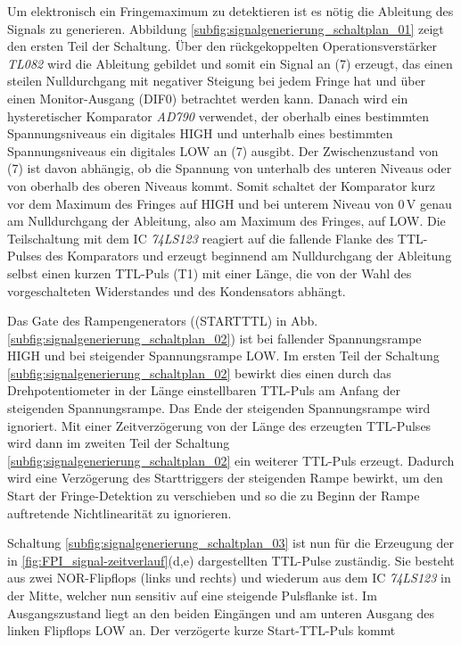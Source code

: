 Um elektronisch ein Fringemaximum zu detektieren ist es nötig die Ableitung
des Signals zu generieren. Abbildung
\ref{subfig:signalgenerierung_schaltplan_01} zeigt den ersten Teil der Schaltung. Über den rückgekoppelten Operationsverstärker
\textit{TL082} wird die Ableitung gebildet und somit ein Signal an (7)
erzeugt, das einen steilen Nulldurchgang mit negativer Steigung bei jedem Fringe hat und über einen
Monitor-Ausgang (DIF0) betrachtet werden kann. Danach wird ein
hysteretischer Komparator \textit{AD790} verwendet, der oberhalb eines
bestimmten Spannungsniveaus ein digitales HIGH und unterhalb eines bestimmten Spannungsniveaus
ein digitales LOW an (7) ausgibt. Der Zwischenzustand von (7) ist
davon abhängig, ob die Spannung von unterhalb des unteren Niveaus oder von
oberhalb des oberen Niveaus kommt. Somit schaltet der Komparator kurz vor dem
Maximum des Fringes auf HIGH und bei unterem Niveau von $0\,$V genau am
Nulldurchgang der Ableitung, also am Maximum des Fringes, auf LOW. Die
Teilschaltung mit dem IC \textit{74LS123} reagiert auf die fallende Flanke des
TTL-Pulses des Komparators und erzeugt beginnend am
Nulldurchgang der Ableitung selbst einen kurzen TTL-Puls (T1) mit einer
Länge, die von der Wahl des vorgeschalteten Widerstandes und des
Kondensators abhängt.\par Das Gate des Rampengenerators ((STARTTTL) in Abb.
\ref{subfig:signalgenerierung_schaltplan_02}) ist bei fallender Spannungsrampe
HIGH und bei steigender Spannungsrampe LOW. Im ersten Teil der Schaltung
\ref{subfig:signalgenerierung_schaltplan_02} bewirkt dies einen durch das
Drehpotentiometer in der Länge einstellbaren TTL-Puls am Anfang der steigenden
Spannungsrampe. Das Ende der steigenden Spannungsrampe wird ignoriert.
Mit einer Zeitverzögerung von der Länge des erzeugten TTL-Pulses wird dann im
zweiten Teil der Schaltung \ref{subfig:signalgenerierung_schaltplan_02} ein weiterer TTL-Puls erzeugt.
Dadurch wird eine Verzögerung des Starttriggers der steigenden Rampe bewirkt, um
den Start der Fringe-Detektion zu verschieben und so die zu Beginn der Rampe
auftretende Nichtlinearität zu ignorieren.\par
Schaltung \ref{subfig:signalgenerierung_schaltplan_03} ist nun für die Erzeugung
der in \ref{fig:FPI_signal-zeitverlauf}(d,e) dargestellten TTL-Pulse zuständig. Sie
besteht aus zwei NOR-Flipflops (links und rechts) und wiederum aus dem IC
\textit{74LS123} in der Mitte, welcher nun sensitiv auf eine steigende
Pulsflanke ist. Im Ausgangszustand liegt an den beiden Eingängen und am unteren
Ausgang des linken Flipflops LOW an. Der verzögerte kurze Start-TTL-Puls kommt
